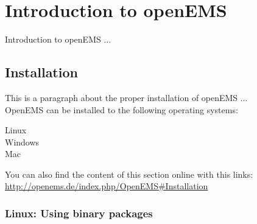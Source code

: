 \chapter{Introduction to openEMS}
Introduction to openEMS ...

\section{Installation}
This is a paragraph about the proper installation of openEMS ...\\
OpenEMS can be installed to the following operating systems:
    \begin{myindentpar}
	Linux\\
	Windows\\
	Mac
    \end{myindentpar}
You can also find the content of this section online with this links:\\
\href{http://openems.de/index.php/OpenEMS#Installation}{\url{http://openems.de/index.php/OpenEMS\#Installation}}


\subsection{Linux: Using binary packages}

